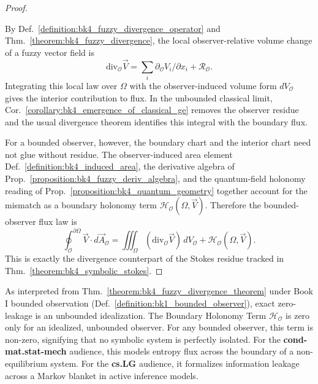 \begin{proof}
\label{proof:bk4_fuzzy_divergence_theorem}
\leavevmode

By Def.~\ref{definition:bk4_fuzzy_divergence_operator} and
Thm.~\ref{theorem:bk4_fuzzy_divergence}, the local observer-relative volume
change of a fuzzy vector field is
\[
\mathrm{div}_{\mathcal O}\vec V
=
\sum_i\partial_{\mathcal O}V_i/\partial x_i+\mathcal R_{\mathcal O}.
\]
Integrating this local law over $\Omega$ with the observer-induced volume form
$dV_{\mathcal O}$ gives the interior contribution to flux. In the unbounded
classical limit, Cor.~\ref{corollary:bk4_emergence_of_classical_ge} removes the
observer residue and the usual divergence theorem identifies this integral with
the boundary flux.

For a bounded observer, however, the boundary chart and the interior chart need
not glue without residue. The observer-induced area element
Def.~\ref{definition:bk4_induced_area}, the derivative algebra of
Prop.~\ref{proposition:bk4_fuzzy_deriv_algebra}, and the quantum-field
holonomy reading of Prop.~\ref{proposition:bk4_quantum_geometry} together
account for the mismatch as a boundary holonomy term
$\mathcal H_{\mathcal O}(\Omega,\vec V)$. Therefore the bounded-observer flux
law is
\[
\oint_{\mathcal{O}}^{\partial\Omega} \vec{V}\cdot d\vec A_{\mathcal O}
=
\iiint_{\Omega}(\mathrm{div}_{\mathcal O}\vec V)\,dV_{\mathcal O}
+\mathcal H_{\mathcal O}(\Omega,\vec V).
\]
This is exactly the divergence counterpart of the Stokes residue tracked in
Thm.~\ref{theorem:bk4_symbolic_stokes}.
\end{proof}

\begin{scholium}
\label{scholium:bk4_zero_is_idealized_in_boundedness}
As interpreted from Thm.~\ref{theorem:bk4_fuzzy_divergence_theorem} under Book I bounded observation (Def.~\ref{definition:bk1_bounded_observer}), exact zero-leakage is an unbounded idealization.
The Boundary Holonomy Term $\mathcal{H}_{\mathcal{O}}$ is zero only for an idealized, unbounded observer. For any bounded observer, this term is non-zero, signifying that no symbolic system is perfectly isolated. For the \textbf{cond-mat.stat-mech} audience, this models entropy flux across the boundary of a non-equilibrium system. For the \textbf{cs.LG} audience, it formalizes information leakage across a Markov blanket in active inference models.
\end{scholium}

